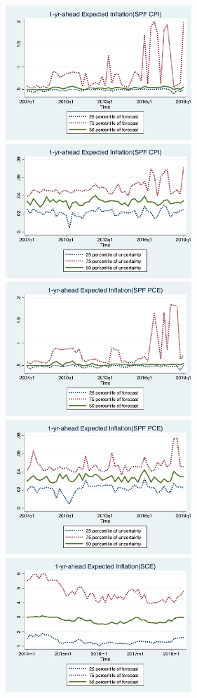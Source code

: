 \documentclass[]{article}
\begin{document}
\begin{figure}[ht]
	\centering
	\includegraphics[width=7cm]{figures/IQRmeanCPIQ.png} 
	\includegraphics[width=7cm]{figures/IQRvarCPIQ.png} \\
	\smallskip
   \includegraphics[width=7cm]{figures/IQRmeanPCEQ.png}
	\includegraphics[width=7cm]{figures/IQRvarPCEQ.png}\\
		\smallskip
		\includegraphics[width=7cm]{figures/IQRmeanSCEM.png}

\end{figure}
\end{document}
